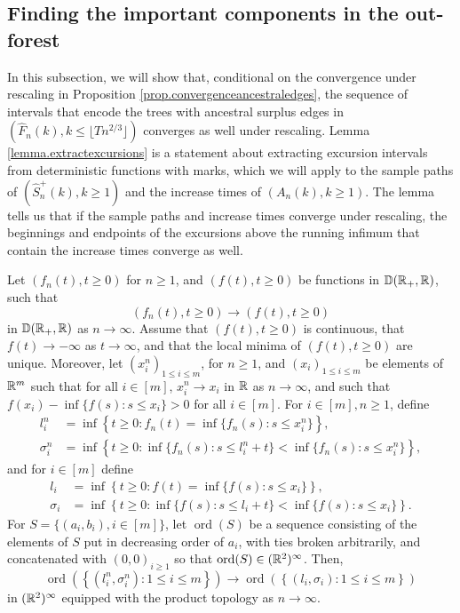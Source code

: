 \subsection{Finding the important components in the out-forest}\label{subsec.componentswithancestral}

In this subsection, we will show that, conditional on the convergence under rescaling in Proposition \ref{prop.convergenceancestraledges}, the sequence of intervals that encode the trees with ancestral surplus edges in $(\hat{F}_n(k),k\leq \lfloor T n^{2/3}\rfloor )$ converges as well under rescaling. Lemma \ref{lemma.extractexcursions} is a statement about extracting excursion intervals from deterministic functions with marks, which we will apply to the sample paths of $(\hat{S}_n^{+}(k),k\geq 1)$ and the increase times of $(A_n(k),k\geq 1)$. The lemma tells us that if the sample paths and increase times converge under rescaling, the beginnings and endpoints of the excursions above the running infimum that contain the increase times converge as well. 
\begin{lemma}\label{lemma.extractexcursions}
Let $(f_n(t), t\geq 0)$ for $n\geq 1$, and $(f(t),t\geq 0)$ be functions in ${\mathbb D}({\mathbb R}_+,{\mathbb R})$, such that 
$$(f_n(t), t\geq 0)\to (f(t),t\geq 0)$$ in ${\mathbb D}({\mathbb R}_+,{\mathbb R})$ as $n\to \infty$. Assume that $(f(t),t\geq 0)$ is continuous, that $f(t)\to -\infty$ as $t\to \infty$, and that the local minima of $(f(t),t\geq 0)$ are unique. Moreover, let $(x_i^n)_{1\leq i\leq m}$, for $n\geq 1$, and $(x_i)_{1\leq i\leq m}$ be elements of ${\mathbb R}^{m}$ such that for all $i\in [m]$, $x_i^n\to x_i$ in ${\mathbb R}$ as $n\to \infty$, and such that $f(x_i)-\inf\{f(s):s\leq x_i\}>0$ for all $i\in [m]$. For $i \in [m], n \geq 1$, define
\begin{align*}
    l_i^n&=\inf\left\{t\geq 0:f_n(t)=\inf\{f_n(s):s\leq x_i^n\}\right\}, \\
    \sigma_i^n&=\inf\left\{ t\geq 0: \inf\{f_n(s):s\leq l_i^n+t\} < \inf\{f_n(s):s\leq x_i^n\}\right\},
\end{align*}
and for $i \in [m]$ define
\begin{align*}
    l_i&=\inf\left\{t\geq 0:f(t)=\inf\{f(s):s\leq x_i\}\right\}, \\
    \sigma_i&=\inf\left\{ t\geq 0: \inf\{f(s):s\leq l_i+ t\} < \inf\{f(s):s\leq x_i\}\right\}.
\end{align*}
For $S=\{(a_i,b_i), i\in [m]\}$, let $\operatorname{ord}(S)$ be a sequence consisting of the elements of $S$ put in decreasing order of $a_i$, with ties broken arbitrarily, and concatenated with $(0,0)_{i\geq 1}$ so that $\operatorname{ord}(S)\in ({\mathbb R}^2)^\infty$. Then, 
$$\operatorname{ord}\left(\left\{(l_i^n,\sigma_i^n):1\leq i \leq m\right\}\right)\to \operatorname{ord}\left(\left\{(l_i,\sigma_i):1\leq i \leq m\right\}\right)$$
in $({\mathbb R}^{2})^\infty$ equipped with the product topology as $n\to \infty$. 
\end{lemma}
